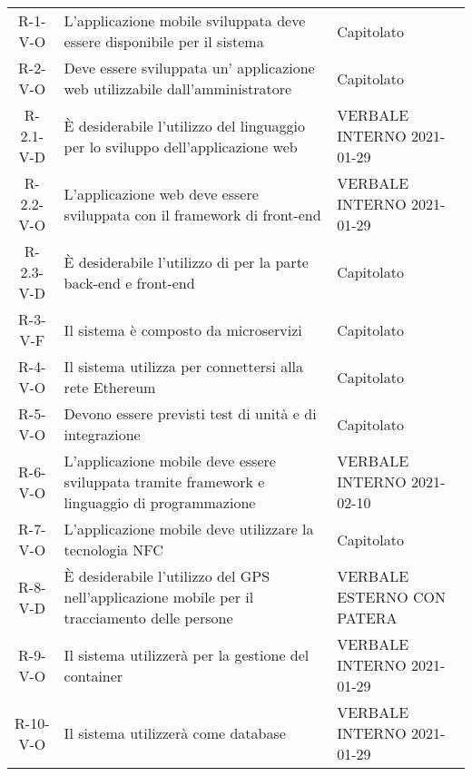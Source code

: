 \begin{longtable}{ c C{7.5cm} C{3cm} }
    R-1-V-O     & L'applicazione mobile sviluppata deve essere disponibile per il sistema  & Capitolato\\
    R-2-V-O     & Deve essere sviluppata un' applicazione web utilizzabile dall'amministratore & Capitolato\\
    R-2.1-V-D   & \`{E} desiderabile l'utilizzo del linguaggio  per lo sviluppo dell'applicazione web & VERBALE INTERNO 2021-01-29 \\
    R-2.2-V-O   & L'applicazione web deve essere sviluppata con il framework di front-end  & VERBALE INTERNO 2021-01-29 \\
    R-2.3-V-D   & \`{E} desiderabile l'utilizzo di  per la parte back-end e front-end &  Capitolato \\
    R-3-V-F     & Il sistema è composto da microservizi & Capitolato\\
    R-4-V-O     & Il sistema utilizza  per connettersi alla rete Ethereum & Capitolato\\
    R-5-V-O     & Devono essere previsti test di unità e di integrazione & Capitolato\\
    R-6-V-O     & L'applicazione mobile deve essere sviluppata tramite framework  e linguaggio di programmazione  & VERBALE INTERNO 2021-02-10 \\
    R-7-V-O     & L'applicazione mobile deve utilizzare la tecnologia NFC & Capitolato \\
    R-8-V-D     & \`{E} desiderabile l'utilizzo del GPS nell'applicazione mobile per il tracciamento delle persone & VERBALE ESTERNO CON PATERA \\
    R-9-V-O     & Il sistema utilizzerà  per la gestione del container & VERBALE INTERNO 2021-01-29 \\
    R-10-V-O    & Il sistema utilizzerà  come database & VERBALE INTERNO 2021-01-29 \\



\end{longtable}